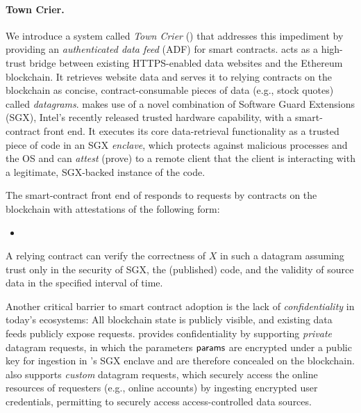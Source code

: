 \paragraph{\bf Town Crier.} We introduce a system called \emph{Town Crier} (\tc) that addresses this impediment by providing an \emph{authenticated data feed} (ADF) for smart contracts. \tc acts as a high-trust bridge between existing HTTPS-enabled data websites and the Ethereum blockchain. It retrieves website data and serves it to relying contracts on the blockchain as concise, contract-consumable pieces of data (e.g., stock quotes) called \emph{datagrams}. \tc makes use of a novel combination of Software Guard Extensions (SGX),  Intel's recently released trusted hardware capability, with a smart-contract front end. It executes its core data-retrieval functionality as a trusted piece of code in an SGX \emph{enclave}, which protects against malicious processes and the OS and can \emph{attest} (prove) to a remote client that the client is interacting with a legitimate, SGX-backed instance of the \tc code. 

The smart-contract front end of \tcs responds to requests by contracts on the blockchain with attestations of the following form:

\begin{itemize}[leftmargin=3mm]
\item[]
\end{itemize}

A relying contract can verify the correctness of $X$ in such a datagram assuming trust only in the security of SGX, the (published) \tc code, and the validity of source data in the specified interval of time. 

Another critical barrier to smart contract adoption is the lack of {\em confidentiality} in today's ecosystems: All blockchain state is publicly visible, and existing data feeds publicly expose requests. \tc provides confidentiality by supporting {\em private} datagram requests, in which the parameters ${\sf params}$ are encrypted under a \tc public key for ingestion in \tc's SGX enclave and are therefore concealed on the blockchain. \tc also supports {\em custom} datagram requests, which securely access the online resources of requesters (e.g., online accounts) by ingesting encrypted user credentials, permitting \tc to securely access access-controlled data sources.

